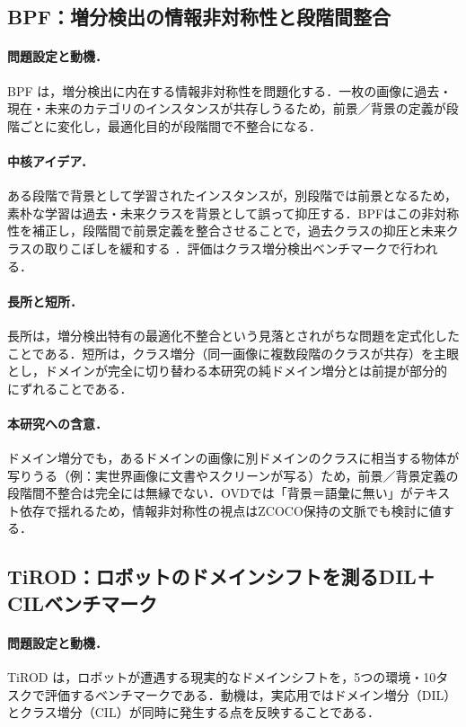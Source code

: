 \subsection{BPF：増分検出の情報非対称性と段階間整合}
\label{subsec:bpf}

\paragraph{問題設定と動機．}
BPF \cite{bpf} は，増分検出に内在する情報非対称性を問題化する．一枚の画像に過去・現在・未来のカテゴリのインスタンスが共存しうるため，前景／背景の定義が段階ごとに変化し，最適化目的が段階間で不整合になる．

\paragraph{中核アイデア．}
ある段階で背景として学習されたインスタンスが，別段階では前景となるため，素朴な学習は過去・未来クラスを背景として誤って抑圧する．BPFはこの非対称性を補正し，段階間で前景定義を整合させることで，過去クラスの抑圧と未来クラスの取りこぼしを緩和する \cite{bpf}．評価はクラス増分検出ベンチマークで行われる．

\paragraph{長所と短所．}
長所は，増分検出特有の最適化不整合という見落とされがちな問題を定式化したことである．短所は，クラス増分（同一画像に複数段階のクラスが共存）を主眼とし，ドメインが完全に切り替わる本研究の純ドメイン増分とは前提が部分的にずれることである．

\paragraph{本研究への含意．}
ドメイン増分でも，あるドメインの画像に別ドメインのクラスに相当する物体が写りうる（例：実世界画像に文書やスクリーンが写る）ため，前景／背景定義の段階間不整合は完全には無縁でない．OVDでは「背景＝語彙に無い」がテキスト依存で揺れるため，情報非対称性の視点はZCOCO保持の文脈でも検討に値する．


\subsection{TiROD：ロボットのドメインシフトを測るDIL＋CILベンチマーク}
\label{subsec:tirod}

\paragraph{問題設定と動機．}
TiROD \cite{tirod} は，ロボットが遭遇する現実的なドメインシフトを，5つの環境・10タスクで評価するベンチマークである．動機は，実応用ではドメイン増分（DIL）とクラス増分（CIL）が同時に発生する点を反映することである．

